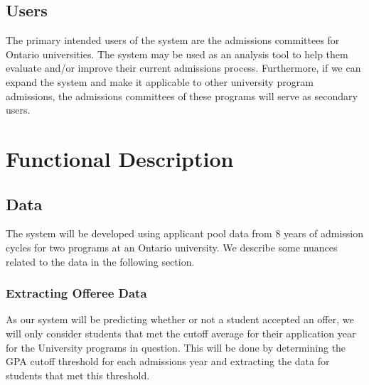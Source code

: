 \documentclass{article}
\begin{document}
\begin{normalsize}
        \subsection{Users}
        The primary intended users of the system are the admissions committees for Ontario universities. The system may be used as an analysis tool to help them evaluate and/or improve their current admissions process. Furthermore, if we can expand the system and make it applicable to other university program admissions, the admissions committees of these programs will serve as secondary users.

    \section{Functional Description}
        \subsection{Data}
        The system will be developed using applicant pool data from 8 years of admission cycles for two programs at an Ontario university. We describe some nuances related to the data in the following section.
        
        \subsubsection{Extracting Offeree Data}
        \label{cutoffMetDataCleaning}
        As our system will be predicting whether or not a student accepted an offer, we will only consider students that met the cutoff average for their application year for the University programs in question. This will be done by determining the GPA cutoff threshold for each admissions year and extracting the data for students that met this threshold.

\end{normalsize}
\end{document}
